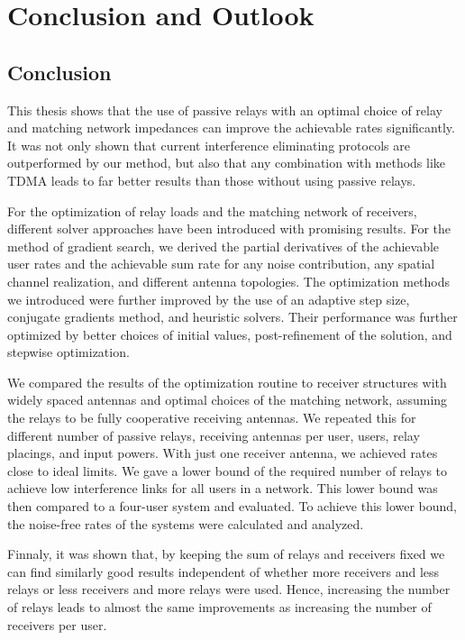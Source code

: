 \chapter{Conclusion and Outlook}

\section{Conclusion}
\label{sec:conclusion}
This thesis shows that the use of passive relays with an optimal choice of relay and matching network impedances can improve the achievable rates significantly.
It was not only shown that current interference eliminating protocols are outperformed by our method, but also that any combination with methods like TDMA leads to far better results than those without using passive relays.

For the optimization of relay loads and the matching network of receivers, different solver approaches have been introduced with promising results.
For the method of gradient search, we derived the partial derivatives of the achievable user rates and the achievable sum rate for any noise contribution, any spatial channel realization, and  different antenna topologies.
The optimization methods we introduced were further improved by the use of an adaptive step size, conjugate gradients method, and heuristic solvers.
Their performance was further optimized by better choices of initial values, post-refinement of the solution, and stepwise optimization. 

We compared the results of the optimization routine to receiver structures with widely spaced antennas and optimal choices of the matching network, assuming the relays to be fully cooperative receiving antennas.
We repeated this for  different number of passive relays, receiving antennas per user, users, relay placings, and input powers.
With just one receiver antenna, we achieved rates close to ideal limits.
We gave a lower bound of the required number of relays to achieve low interference links for all users in a network.
This lower bound was then compared to a four-user system and evaluated.
To achieve this lower bound, the noise-free rates of the systems were calculated and analyzed.

Finnaly, it was shown that, by keeping the sum of relays and receivers fixed we can find similarly good results independent of whether more receivers and less relays or less receivers and more relays were used.
Hence, increasing the number of relays leads to almost the same improvements as increasing the number of receivers per user.

